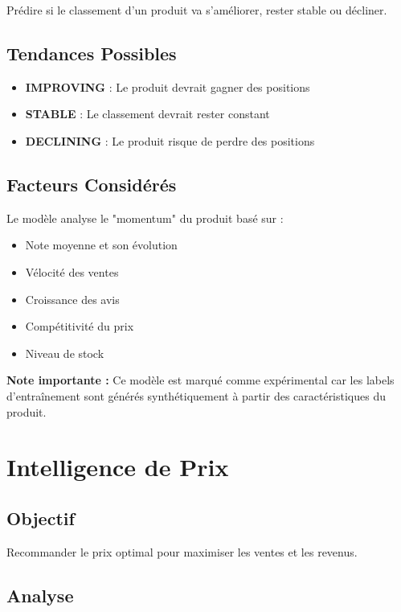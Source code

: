 \documentclass[12pt,a4paper]{report}
\begin{document}
Prédire si le classement d'un produit va s'améliorer, rester stable ou décliner.

\subsection{Tendances Possibles}

\begin{itemize}[noitemsep]
    \item \textbf{IMPROVING} : Le produit devrait gagner des positions
    \item \textbf{STABLE} : Le classement devrait rester constant
    \item \textbf{DECLINING} : Le produit risque de perdre des positions
\end{itemize}

\subsection{Facteurs Considérés}

Le modèle analyse le "momentum" du produit basé sur :
\begin{itemize}[noitemsep]
    \item Note moyenne et son évolution
    \item Vélocité des ventes
    \item Croissance des avis
    \item Compétitivité du prix
    \item Niveau de stock
\end{itemize}

\textbf{Note importante :} Ce modèle est marqué comme expérimental car les labels d'entraînement sont générés synthétiquement à partir des caractéristiques du produit.

\section{Intelligence de Prix}

\subsection{Objectif}

Recommander le prix optimal pour maximiser les ventes et les revenus.

\subsection{Analyse}
\end{document}
